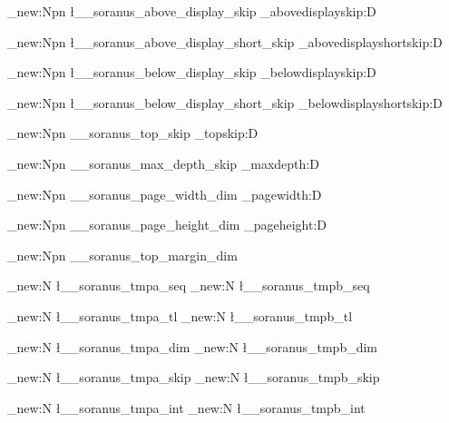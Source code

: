 %
%
%
% 
%




\cs_new:Npn \l__soranus_above_display_skip
  {\tex_abovedisplayskip:D}

\cs_new:Npn \l__soranus_above_display_short_skip
  {\tex_abovedisplayshortskip:D}

\cs_new:Npn \l__soranus_below_display_skip
  {\tex_belowdisplayskip:D}

\cs_new:Npn \l__soranus_below_display_short_skip
  {\tex_belowdisplayshortskip:D}

\cs_new:Npn \g__soranus_top_skip
  {\tex_topskip:D}

\cs_new:Npn \g__soranus_max_depth_skip
  {\tex_maxdepth:D}

\cs_new:Npn \g__soranus_page_width_dim
  {\tex_pagewidth:D}

\cs_new:Npn \g__soranus_page_height_dim
  {\tex_pageheight:D}




\cs_new:Npn \g__soranus_top_margin_dim
  {\topmargin}





%

\seq_new:N \l__soranus_tmpa_seq
\seq_new:N \l__soranus_tmpb_seq

\tl_new:N \l__soranus_tmpa_tl
\tl_new:N \l__soranus_tmpb_tl

\dim_new:N \l__soranus_tmpa_dim
\dim_new:N \l__soranus_tmpb_dim

\skip_new:N \l__soranus_tmpa_skip
\skip_new:N \l__soranus_tmpb_skip

\int_new:N \l__soranus_tmpa_int
\int_new:N \l__soranus_tmpb_int

